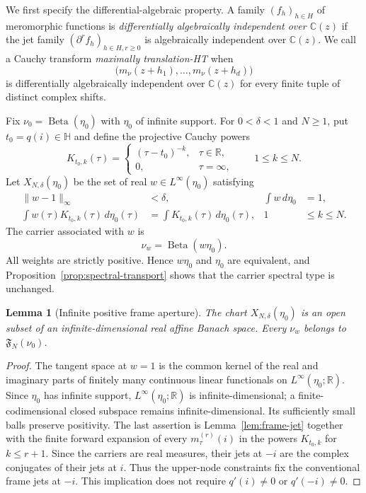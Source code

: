 \documentclass[11pt]{article}
\newtheorem{lemma}[theorem]{Lemma}
\newcommand{\C}{\mathbb C}
\newcommand{\R}{\mathbb R}
\newcommand{\HH}{\mathbb H}
\newcommand{\D}{\partial}
\newcommand{\Beta}{\operatorname{Beta}}
\begin{document}
We first specify the differential-algebraic property.  A family $(f_h)_{h\in H}$ of meromorphic
functions is \emph{differentially algebraically independent over $\C(z)$} if the jet family
$(\D^rf_h)_{h\in H,r\geq0}$ is algebraically independent over $\C(z)$.  We call a Cauchy
transform \emph{maximally translation-HT} when
\begin{equation}\label{eq:maxht}
  \bigl(m_\nu(z+h_1),\ldots,m_\nu(z+h_d)\bigr)
\end{equation}
is differentially algebraically independent over $\C(z)$ for every finite tuple of distinct
complex shifts.

Fix $\nu_0=\Beta(\eta_0)$ with $\eta_0$ of infinite support.  For $0<\delta<1$ and $N\geq1$,
put $t_0=q(i)\in\HH$ and define the projective Cauchy powers
\[
  K_{t_0,k}(\tau)=
  \begin{cases}(\tau-t_0)^{-k},&\tau\in\R,\\0,&\tau=\infty,
  \end{cases}
  \qquad 1\leq k\leq N.
\]
Let $X_{N,\delta}(\eta_0)$ be the set of real $w\in L^\infty(\eta_0)$ satisfying
\begin{equation}\label{eq:chart}
\begin{aligned}
  \|w-1\|_\infty&<\delta, & \int w\,d\eta_0&=1,\\
  \int w(\tau)K_{t_0,k}(\tau)\,d\eta_0(\tau)
    &=\int K_{t_0,k}(\tau)\,d\eta_0(\tau),
    & 1&\leq k\leq N.
\end{aligned}
\end{equation}
The carrier associated with $w$ is
\begin{equation}\label{eq:weighted-carrier}
  \nu_w=\Beta(w\eta_0).
\end{equation}
All weights are strictly positive.  Hence $w\eta_0$ and $\eta_0$ are equivalent, and
Proposition~\ref{prop:spectral-transport} shows that the carrier spectral type is unchanged.

\begin{lemma}[Infinite positive frame aperture]\label{lem:aperture}
The chart $X_{N,\delta}(\eta_0)$ is an open subset of an infinite-dimensional real affine Banach
space.  Every $\nu_w$ belongs to $\mathfrak F_N(\nu_0)$.
\end{lemma}

\begin{proof}
The tangent space at $w=1$ is the common kernel of the real and imaginary parts of finitely many
continuous linear functionals on $L^\infty(\eta_0;\R)$.  Since $\eta_0$ has infinite support,
$L^\infty(\eta_0;\R)$ is infinite-dimensional; a finite-codimensional closed subspace remains
infinite-dimensional.  Its sufficiently small balls preserve positivity.  The last assertion is
Lemma~\ref{lem:frame-jet} together with the finite forward expansion of every
$m_\tau^{(r)}(i)$ in the powers $K_{t_0,k}$ for $k\leq r+1$.  Since the carriers are real
measures, their jets at $-i$ are the complex conjugates of their jets at $i$.  Thus the upper-node
constraints fix the conventional frame jets at $-i$.  This implication does not require
$q'(i)\neq0$ or $q'(-i)\neq0$.
\end{proof}
\end{document}
